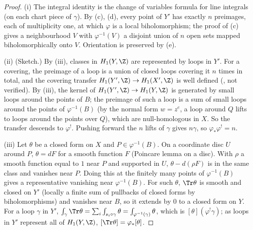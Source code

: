 \begin{proof}
(i) The integral identity is the change of variables formula for line integrals (on each chart piece of $\gamma$). By (c), (d), every
point of $Y'$ has exactly $n$ preimages, each of multiplicity one, at which $\varphi$ is a local biholomorphism; the proof of (c) gives a
neighbourhood $V$ with $\varphi^{-1}(V)$ a disjoint union of $n$ open sets mapped biholomorphically onto $V$. Orientation is preserved by (e).

(ii) (Sketch.) By (iii), classes in $H_1(Y,\Z)$ are represented by loops in $Y'$. For a covering, the preimage of a loop is a union of closed
loops covering it $n$ times in total, and the covering transfer $H_1(Y',\Z)\to H_1(X',\Z)$ is well defined (\cite[Section 3.G]{Hatcher02}, not verified). By
(iii), the kernel of $H_1(Y',\Z)\to H_1(Y,\Z)$ is generated by small loops around the points of $B$; the preimage of such a loop is a sum of small loops
around the points of $\varphi^{-1}(B)$ (by the normal form $w=z^e$, a loop around $Q$ lifts to loops around the points over $Q$), which are null-homologous in $X$. So the transfer
descends to $\varphi^!$. Pushing forward the $n$ lifts of $\gamma$ gives $n\gamma$, so $\varphi_*\varphi^!=n$.

(iii) Let $\theta$ be a closed form on $X$ and $P\in\varphi^{-1}(B)$. On a coordinate disc $U$ around $P$, $\theta=dF$ for a smooth function $F$ (Poincare lemma on a disc).
With $\rho$ a smooth function equal to $1$ near $P$ and supported in $U$, $\theta-d(\rho F)$ is in the same class and vanishes near $P$. Doing this at the finitely many points of
$\varphi^{-1}(B)$ gives a representative vanishing near $\varphi^{-1}(B)$. For such $\theta$, $\Tr\theta$ is smooth and closed on $Y'$ (locally a finite sum of pullbacks of closed forms
by biholomorphisms) and vanishes near $B$, so it extends by $0$ to a closed form on $Y$. For a loop $\gamma$ in $Y'$, $\int_\gamma\Tr\theta=\sum_i\int_{s_i\circ\gamma}\theta=\int_{\varphi^{-1}(\gamma)}\theta$,
which is $[\theta](\varphi^!\gamma)$; as loops in $Y'$ represent all of $H_1(Y,\Z)$, $[\Tr\theta]=\varphi_*[\theta]$.


\end{proof}
